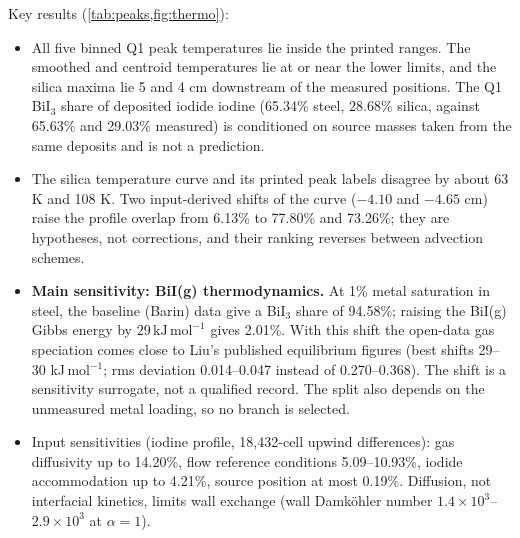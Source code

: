 \documentclass[11pt,a4paper]{article}
\newcommand{\units}[1]{\,\mathrm{#1}}
\begin{document}
\begin{table}[tb]
\centering
\caption{Q1 iodide maxima on the production mesh compared with the
published peaks \cite{Liu2025chemical}. Subscript bin: 1 cm binned
maximum; 3: maximum of the 3 cm smoothed profile; $T_{\rm c}$: wall
temperature at the deposit centroid. Positions in cm, temperatures in
$^\circ$C; experimental ranges are those printed in the paper.}
\label{tab:peaks}
\small
\end{table}

Key results (\cref{tab:peaks,fig:thermo}):
\begin{itemize}
\item All five binned Q1 peak temperatures lie inside the printed
  ranges. The smoothed and centroid temperatures lie at or near the
  lower limits, and the silica maxima lie 5 and 4 cm downstream of the
  measured positions. The Q1 BiI$_3$ share of deposited iodide iodine
  (65.34\% steel, 28.68\% silica, against 65.63\% and 29.03\% measured) is
  conditioned on source masses taken from the same deposits and is not a
  prediction.
\item The silica temperature curve and its printed peak labels disagree
  by about 63 K and 108 K. Two input-derived shifts of the curve
  ($-4.10$ and $-4.65$ cm) raise the profile overlap from 6.13\% to
  77.80\% and 73.26\%; they are hypotheses, not corrections, and their
  ranking reverses between advection schemes.
\item \textbf{Main sensitivity: BiI(g) thermodynamics.} At 1\% metal
  saturation in steel, the baseline (Barin) data give a BiI$_3$ share of
  94.58\%; raising the BiI(g) Gibbs energy by $29\units{kJ\,mol^{-1}}$
  gives 2.01\%. With this shift the open-data gas speciation comes close
  to Liu's published equilibrium figures (best shifts 29--30
  kJ\,mol$^{-1}$; rms deviation 0.014--0.047 instead of 0.270--0.368). The shift is a sensitivity surrogate, not a qualified
  record. The split also depends on the unmeasured metal loading, so no
  branch is selected.
\item Input sensitivities (iodine profile, 18,432-cell upwind
  differences): gas diffusivity up to 14.20\%, flow reference
  conditions 5.09--10.93\%, iodide accommodation up to 4.21\%, source
  position at most 0.19\%. Diffusion, not interfacial kinetics, limits
  wall exchange (wall Damk\"ohler number $1.4\times10^3$--$2.9\times10^3$
  at $\alpha=1$).
\end{itemize}
\end{document}
